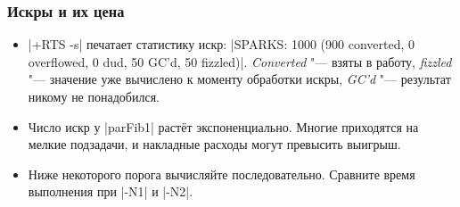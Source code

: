 \documentclass[11pt]{beamer}
\begin{document}
\begin{frame}[fragile]
  \frametitle{Искры и их цена}
  \begin{itemize}
    \item \ghcinline|+RTS -s| печатает статистику искр: \ghcinline|SPARKS: 1000 (900 converted, 0 overflowed, 0 dud, 50 GC'd, 50 fizzled)|. \emph{Converted} "--- взяты в работу, \emph{fizzled} "--- значение уже вычислено к моменту обработки искры, \emph{GC'd} "--- результат никому не понадобился.
          \pause
    \item Число искр у \haskinline|parFib1| растёт экспоненциально. Многие приходятся на мелкие подзадачи, и накладные расходы могут превысить выигрыш.
    \item Ниже некоторого порога вычисляйте последовательно. Сравните время выполнения при \ghcinline|-N1| и \ghcinline|-N2|.
  \end{itemize}
\end{frame}

\end{document}
